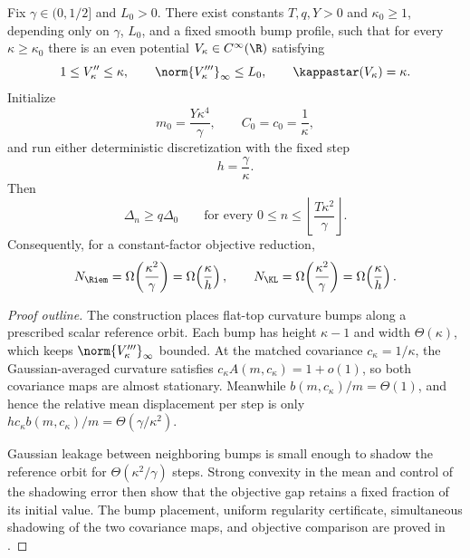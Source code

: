 \begin{theorem}
\label{thm:global:bump-lower}
Fix \(\gamma\in(0,1/2]\) and \(L_0>0\).  There exist constants
\(T,q,Y>0\) and \(\kappa_0\geq1\), depending only on \(\gamma\), \(L_0\), and a fixed smooth
bump profile, such that for every \(\kappa\geq\kappa_0\) there is an even potential
\(V_\kappa\in C^\infty(\R)\) satisfying
\begin{equation}
\label{eq:global:bump-regularity}
    1\leq V_\kappa''\leq\kappa,
    \qquad
    \norm{V_\kappa'''}_\infty\leq L_0,
    \qquad
    \kappastar(V_\kappa)=\kappa.
\end{equation}
Initialize
\begin{equation}
\label{eq:global:bump-initialization}
    m_0=\frac{Y\kappa^4}{\gamma},
    \qquad
    C_0=c_0=\frac1\kappa,
\end{equation}
and run either deterministic discretization with the fixed step
\begin{equation}
\label{eq:global:bump-step}
    h=\frac\gamma\kappa.
\end{equation}
Then
\begin{equation}
\label{eq:global:bump-gap-lower}
    \Delta_n\geq q\Delta_0
    \qquad
    \text{for every }0\leq n\leq
    \left\lfloor\frac{T\kappa^2}{\gamma}\right\rfloor.
\end{equation}
Consequently, for a constant-factor objective reduction,
\begin{equation}
\label{eq:global:bump-complexity-lower}
    N_{\Riem}=\Omega\!\left(\frac{\kappa^2}{\gamma}\right)
    =\Omega\!\left(\frac\kappa h\right),
    \qquad
    N_{\KL}=\Omega\!\left(\frac{\kappa^2}{\gamma}\right)
    =\Omega\!\left(\frac\kappa h\right).
\end{equation}
\end{theorem}

\begin{proof}[Proof outline]
The construction places flat-top curvature bumps along a prescribed scalar reference orbit.  Each
bump has height \(\kappa-1\) and width \(\Theta(\kappa)\), which keeps
\(\norm{V_\kappa'''}_\infty\) bounded.  At the matched covariance \(c_\kappa=1/\kappa\), the
Gaussian-averaged curvature satisfies
\(
c_\kappa A(m,c_\kappa)=1+o(1)
\), so both covariance maps are almost stationary.  Meanwhile
\(
b(m,c_\kappa)/m=\Theta(1)
\), and hence the relative mean displacement per step is only
\(
h c_\kappa b(m,c_\kappa)/m=\Theta(\gamma/\kappa^2)
\).

Gaussian leakage between neighboring bumps is small enough to shadow the reference orbit for
\(\Theta(\kappa^2/\gamma)\) steps.  Strong convexity in the mean and control of the shadowing error
then show that the objective gap retains a fixed fraction of its initial value.  The bump
placement, uniform regularity certificate, simultaneous shadowing of the two covariance maps, and
objective comparison are proved in .
\end{proof}

